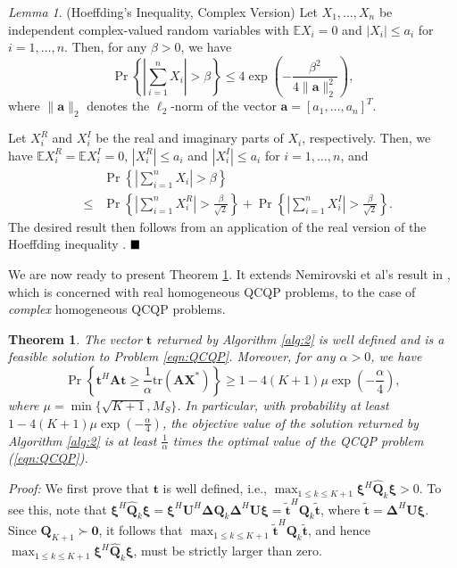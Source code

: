 \documentclass[twocolumn,10pt]{IEEEtran}
\theoremstyle{plain} \newtheorem{theorem}{Theorem}
\theoremstyle{plain} \newtheorem{proposition}{Proposition}
\theoremstyle{plain} \newtheorem{corollary}{Corollary}
\theoremstyle{remark} \newtheorem{remark}{Remark}
\theoremstyle{remark} \newtheorem{lemma}{Lemma}
\theoremstyle{plain} \newtheorem{definition}{Definition}
\theoremstyle{plain} \newtheorem{assumption}{Assumption}
\theoremstyle{plain} \newtheorem{fact}{Fact}
\begin{document}
\begin{lemma} \label{lem:Hoeffding}
(Hoeffding's Inequality, Complex Version) Let $X_1,\ldots,X_n$ be independent complex-valued random variables with ${\mathbb E}X_i=0$ and $|X_i|\leq a_i$ for $i=1,\ldots,n$.  Then, for any $\beta>0$, we have
$$ \Pr\left\{\left|\sum_{i=1}^n X_i\right| > \beta\right\} \le 4\exp\left(-\frac{\beta^2}{4\|\mathbf{a}\|_2^2}\right), $$
where $\|\mathbf{a}\|_2$ denotes the $\ell_2$-norm of the vector $\mathbf{a}=[a_1, \ldots, a_n]^T$.
\end{lemma}
 Let $X_i^R$ and $X_i^I$ be the real and imaginary parts of $X_i$, respectively.  Then, we have ${\mathbb E}X_i^R={\mathbb E}X_i^I=0$, $|X_i^R|\le a_i$ and $|X_i^I|\le a_i$ for $i=1,\ldots,n$, and
\begin{eqnarray*}
 &&\Pr\left\{\left|\sum_{i=1}^n X_i\right| > \beta\right\}\\
  &\le& \Pr\left\{\left|\sum_{i=1}^n X_i^R\right| > \frac{\beta}{\sqrt{2}} \right\} + \Pr\left\{\left|\sum_{i=1}^n X_i^I\right| > \frac{\beta}{\sqrt{2}} \right\}. 
 \end{eqnarray*}
The desired result then follows from an application of the real version of the Hoeffding inequality \cite{H63}.
$\hfill\blacksquare$

We are now ready to present Theorem \ref{thm:random}.  It extends Nemirovski et al's result in \cite{NRT99}, which is concerned with real homogeneous QCQP problems, to the case of \emph{complex} homogeneous QCQP problems.

\begin{theorem}\label{thm:random}
The vector $\mathbf{t}$ returned by Algorithm \ref{alg:2} is well defined and is a feasible solution to Problem \eqref{eqn:QCQP}. Moreover, for any $\alpha>0$, we have
\begin{equation}\label{eqn:prob}
\Pr\left\{\mathbf{t}^H\mathbf{A}\mathbf{t}\geq \frac{1}{\alpha}\mathrm{tr}(\mathbf{A}\mathbf{X}^*)\right\}\geq 1 - 4(K+1)\mu \exp\left(-\frac{\alpha}{4}\right),
\end{equation}
where $\mu=\min\{\sqrt{K+1}, M_S\}$.  In particular, with probability at least $1-4(K+1)\mu\exp\left(-\frac{\alpha}{4}\right)$, the objective value of the solution returned by Algorithm \ref{alg:2} is at least $\frac{1}{\alpha}$ times the optimal value of the QCQP problem (\ref{eqn:QCQP}).
\end{theorem}
\noindent\emph{Proof:} We first prove that $\mathbf{t}$ is well defined, i.e., $\max_{1\le k\le K+1} \mathbf{\xi}^H\widehat{\mathbf{Q}}_k\mathbf{\xi}>0$. To see this, note that $\mathbf{\xi}^H\widehat{\mathbf{Q}}_k\mathbf{\xi}=\mathbf{\xi}^H\mathbf{U}^H\mathbf{\Delta}\mathbf{Q}_k\mathbf{\Delta}^H\mathbf{U}\mathbf{\xi}=\tilde{\mathbf{t}}^H\mathbf{Q}_k\tilde{\mathbf{t}}$, where $\tilde{\mathbf{t}}=\mathbf{\Delta}^H\mathbf{U}\mathbf{\xi}$.  Since $\mathbf{Q}_{K+1}\succ\mathbf{0}$, it follows that $\max_{1\le k\le K+1} \tilde{\mathbf{t}}^H\mathbf{Q}_k\tilde{\mathbf{t}}$, and hence $\max_{1\le k\le K+1} \mathbf{\xi}^H\widehat{\mathbf{Q}}_k\mathbf{\xi}$, must be strictly larger than zero.
\end{document}
